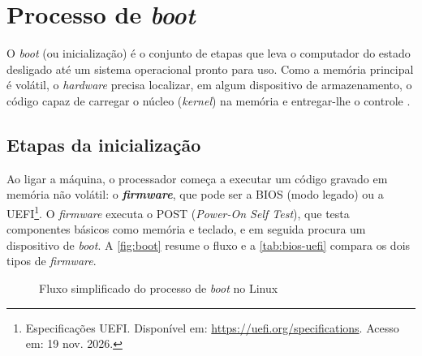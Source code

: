 \chapter{Processo de \textit{boot}}\label{cap:boot}

O \textit{boot} (ou inicialização) é o conjunto de etapas que leva o computador do estado
desligado até um sistema operacional pronto para uso. Como a memória principal é volátil, o
\textit{hardware} precisa localizar, em algum dispositivo de armazenamento, o código capaz de
carregar o núcleo (\textit{kernel}) na memória e entregar-lhe o controle \cite{tanenbaum2016}.

\section{Etapas da inicialização}\label{sec:etapas-boot}

Ao ligar a máquina, o processador começa a executar um código gravado em memória não volátil:
o \textbf{\textit{firmware}}, que pode ser a BIOS (modo legado) ou a
UEFI\footnote{Especificações UEFI. Disponível em: \url{https://uefi.org/specifications}. Acesso
em: 19 nov. 2026.}. O \textit{firmware} executa o POST (\textit{Power-On Self Test}), que testa
componentes básicos como memória e teclado, e em seguida procura um dispositivo de
\textit{boot}. A \autoref{fig:boot} resume o fluxo e a \autoref{tab:bios-uefi} compara os dois
tipos de \textit{firmware}.

\begin{figure}[H]
    \centering
    \caption{Fluxo simplificado do processo de \textit{boot} no Linux}
    \label{fig:boot}
\end{figure}

